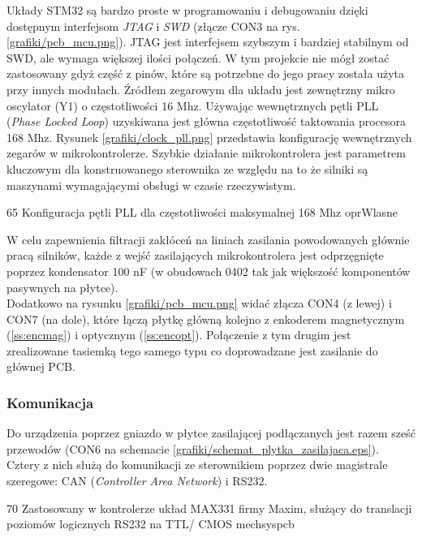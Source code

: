 Układy STM32 są bardzo proste w programowaniu i debugowaniu dzięki dostępnym interfejsom {\it JTAG} i {\it SWD} (złącze CON3 na rys. \ref{grafiki/pcb_mcu.png}). JTAG jest interfejsem szybszym i bardziej stabilnym od SWD, ale wymaga większej ilości połączeń. W tym projekcie nie mógł zostać zastosowany gdyż część z pinów, które są potrzebne do jego pracy została użyta przy innych modułach. Źródłem zegarowym dla układu jest zewnętrzny mikro oscylator (Y1) o częstotliwości 16 Mhz. Używając wewnętrznych pętli PLL ({\it Phase Locked Loop}) uzyskiwana jest główna częstotliwość taktowania procesora 168 Mhz. Rysunek \ref{grafiki/clock_pll.png} przedstawia konfigurację wewnętrznych zegarów w mikrokontrolerze. Szybkie działanie mikrokontrolera jest parametrem kluczowym dla konstruowanego sterownika ze względu na to że silniki są maszynami wymagającymi obsługi w czasie rzeczywistym.

	{65}
	{Konfiguracja pętli PLL dla częstotliwości maksymalnej 168 Mhz}
	{oprWlasne}

W celu zapewnienia filtracji zakłóceń na liniach zasilania powodowanych głównie pracą silników, każde z wejść zasilających mikrokontrolera jest odprzęgnięte poprzez kondensator 100 nF (w obudowach 0402 tak jak większość komponentów pasywnych na płytce). \\

Dodatkowo na rysunku \ref{grafiki/pcb_mcu.png} widać złącza CON4 (z lewej) i CON7 (na dole), które łączą płytkę główną kolejno z enkoderem magnetycznym (\ref{ss:encmag}) i optycznym (\ref{ss:encopt}). Połączenie z tym drugim jest zrealizowane tasiemką tego samego typu co doprowadzane jest zasilanie do głównej PCB.

\subsubsection{Komunikacja}
\label{sss:hardware_komunikacja}

Do urządzenia poprzez gniazdo w płytce zasilającej podłączanych jest razem sześć przewodów (CON6 na schemacie \ref{grafiki/schemat_plytka_zasilajaca.eps}). Cztery z nich służą do komunikacji ze sterownikiem poprzez dwie magistrale szeregowe: CAN ({\it Controller Area Network}) i RS232.

	{70}
	{Zastosowany w kontrolerze układ MAX331 firmy Maxim, służący do translacji poziomów logicznych RS232 na TTL/ CMOS}
	{mechsyspcb}

